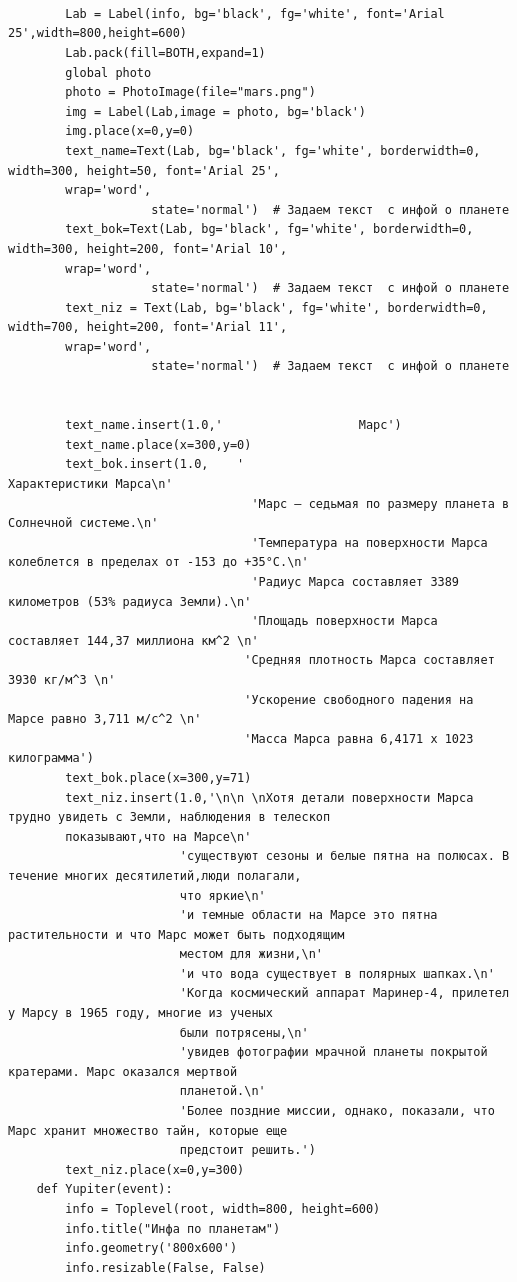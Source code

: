 \documentclass[11pt,a4paper]{report}
\begin{document}
\begin{verbatim}
        
        
    
        Lab = Label(info, bg='black', fg='white', font='Arial 25',width=800,height=600)  
        Lab.pack(fill=BOTH,expand=1)
        global photo
        photo = PhotoImage(file="mars.png")
        img = Label(Lab,image = photo, bg='black')
        img.place(x=0,y=0)
        text_name=Text(Lab, bg='black', fg='white', borderwidth=0, width=300, height=50, font='Arial 25', 
        wrap='word',
                    state='normal')  # Задаем текст  с инфой о планете
        text_bok=Text(Lab, bg='black', fg='white', borderwidth=0, width=300, height=200, font='Arial 10', 
        wrap='word',
                    state='normal')  # Задаем текст  с инфой о планете
        text_niz = Text(Lab, bg='black', fg='white', borderwidth=0, width=700, height=200, font='Arial 11', 
        wrap='word',
                    state='normal')  # Задаем текст  с инфой о планете
    
       
        text_name.insert(1.0,'                   Марс')
        text_name.place(x=300,y=0)
        text_bok.insert(1.0,    '                                           Характеристики Марса\n' 
                                  'Марс – седьмая по размеру планета в Солнечной системе.\n'
                                  'Температура на поверхности Марса колеблется в пределах от -153 до +35°C.\n'
                                  'Радиус Марса составляет 3389 километров (53% радиуса Земли).\n'
                                  'Площадь поверхности Марса составляет 144,37 миллиона км^2 \n'
                                 'Средняя плотность Марса составляет 3930 кг/м^3 \n'                              
                                 'Ускорение свободного падения на Марсе равно 3,711 м/c^2 \n'
                                 'Масса Марса равна 6,4171 х 1023 килограмма')
        text_bok.place(x=300,y=71)        
        text_niz.insert(1.0,'\n\n \nХотя детали поверхности Марса трудно увидеть с Земли, наблюдения в телескоп 
        показывают,что на Марсе\n'
                        'существуют сезоны и белые пятна на полюсах. В течение многих десятилетий,люди полагали,
                        что яркие\n'
                        'и темные области на Марсе это пятна растительности и что Марс может быть подходящим 
                        местом для жизни,\n'
                        'и что вода существует в полярных шапках.\n'
                        'Когда космический аппарат Маринер-4, прилетел у Марсу в 1965 году, многие из ученых 
                        были потрясены,\n'
                        'увидев фотографии мрачной планеты покрытой кратерами. Марс оказался мертвой 
                        планетой.\n'
                        'Более поздние миссии, однако, показали, что Марс хранит множество тайн, которые еще 
                        предстоит решить.')
        text_niz.place(x=0,y=300)
    def Yupiter(event): 
        info = Toplevel(root, width=800, height=600)
        info.title("Инфа по планетам")
        info.geometry('800x600')
        info.resizable(False, False)  
        

\end{verbatim}
\end{document}
